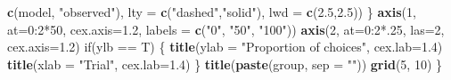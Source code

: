 \documentclass[11pt,,]{article}
\newenvironment{Shaded}{\begin{snugshade}}{\end{snugshade}}
\newcommand{\KeywordTok}[1]{\textcolor[rgb]{0.13,0.29,0.53}{\textbf{{#1}}}}
\newcommand{\DataTypeTok}[1]{\textcolor[rgb]{0.13,0.29,0.53}{{#1}}}
\newcommand{\DecValTok}[1]{\textcolor[rgb]{0.00,0.00,0.81}{{#1}}}
\newcommand{\FloatTok}[1]{\textcolor[rgb]{0.00,0.00,0.81}{{#1}}}
\newcommand{\StringTok}[1]{\textcolor[rgb]{0.31,0.60,0.02}{{#1}}}
\newcommand{\NormalTok}[1]{{#1}}
\begin{document}
\begin{Shaded}
\begin{Highlighting}[]
{{               \KeywordTok{c}\NormalTok{(model, }\StringTok{"observed"}\NormalTok{), }
               \DataTypeTok{lty =} \KeywordTok{c}\NormalTok{(}\StringTok{"dashed"}\NormalTok{,}\StringTok{"solid"}\NormalTok{), }
               \DataTypeTok{lwd =} \KeywordTok{c}\NormalTok{(}\FloatTok{2.5}\NormalTok{,}\FloatTok{2.5}\NormalTok{))}
    \NormalTok{\}}
    \KeywordTok{axis}\NormalTok{(}\DecValTok{1}\NormalTok{,  }\DataTypeTok{at=}\DecValTok{0}\NormalTok{:}\DecValTok{2}\NormalTok{*}\DecValTok{50}\NormalTok{, }\DataTypeTok{cex.axis=}\FloatTok{1.2}\NormalTok{, }\DataTypeTok{labels =} \KeywordTok{c}\NormalTok{(}\StringTok{"0"}\NormalTok{, }\StringTok{"50"}\NormalTok{, }\StringTok{"100"}\NormalTok{)) }
    \KeywordTok{axis}\NormalTok{(}\DecValTok{2}\NormalTok{,  }\DataTypeTok{at=}\DecValTok{0}\NormalTok{:}\DecValTok{2}\NormalTok{*.}\DecValTok{25}\NormalTok{,  }\DataTypeTok{las=}\DecValTok{2}\NormalTok{,  }\DataTypeTok{cex.axis=}\FloatTok{1.2}\NormalTok{)  }
    \NormalTok{if(ylb ==}\StringTok{ }\NormalTok{T) \{}
        \KeywordTok{title}\NormalTok{(}\DataTypeTok{ylab =} \StringTok{"Proportion of choices"}\NormalTok{,  }\DataTypeTok{cex.lab=}\FloatTok{1.4}\NormalTok{)}
        \KeywordTok{title}\NormalTok{(}\DataTypeTok{xlab =} \StringTok{"Trial"}\NormalTok{,  }\DataTypeTok{cex.lab=}\FloatTok{1.4}\NormalTok{)}
    \NormalTok{\}}
    \KeywordTok{title}\NormalTok{(}\KeywordTok{paste}\NormalTok{(group, }\DataTypeTok{sep =} \StringTok{""}\NormalTok{))}
    \KeywordTok{grid}\NormalTok{(}\DecValTok{5}\NormalTok{, }\DecValTok{10}\NormalTok{)}
\NormalTok{\}}


}}
\end{Highlighting}
\end{Shaded}
\end{document}
